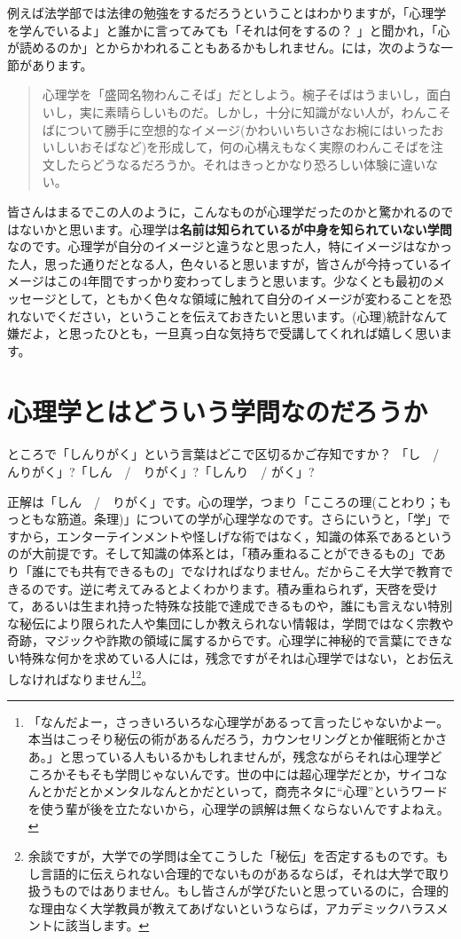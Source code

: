 \documentclass{ltjsbook}
\begin{document}
例えば法学部では法律の勉強をするだろうということはわかりますが，「心理学を学んでいるよ」と誰かに言ってみても「それは何をするの？ 」と聞かれ，「心が読めるのか」とからかわれることもあるかもしれません。\citet{道又200903}には，次のような一節があります。

\begin{quote}
    心理学を「盛岡名物わんこそば」だとしよう。椀子そばはうまいし，面白いし，実に素晴らしいものだ。しかし，十分に知識がない人が，わんこそばについて勝手に空想的なイメージ(かわいいちいさなお椀にはいったおいしいおそばなど)を形成して，何の心構えもなく実際のわんこそばを注文したらどうなるだろうか。それはきっとかなり恐ろしい体験に違いない。
\end{quote}

皆さんはまるでこの人のように，こんなものが心理学だったのかと驚かれるのではないかと思います。心理学は\textbf{名前は知られているが中身を知られていない学問}なのです。心理学が自分のイメージと違うなと思った人，特にイメージはなかった人，思った通りだとなる人，色々いると思いますが，皆さんが今持っているイメージはこの4年間ですっかり変わってしまうと思います。少なくとも最初のメッセージとして，ともかく色々な領域に触れて自分のイメージが変わることを恐れないでください，ということを伝えておきたいと思います。(心理)統計なんて嫌だよ，と思ったひとも，一旦真っ白な気持ちで受講してくれれば嬉しく思います。

\section{心理学とはどういう学問なのだろうか} 

ところで「しんりがく」という言葉はどこで区切るかご存知ですか？ 「し　/ んりがく」?「しん　/　りがく」?「しんり　/ がく」?

正解は「しん　/　りがく」です。心の理学，つまり「こころの理(ことわり；もっともな筋道。条理)」についての学が心理学なのです。さらにいうと，「学」ですから，エンターテインメントや怪しげな術ではなく，知識の体系であるというのが大前提です。そして知識の体系とは，「積み重ねることができるもの」であり「誰にでも共有できるもの」でなければなりません。だからこそ大学で教育できるのです。逆に考えてみるとよくわかります。積み重ねられず，天啓を受けて，あるいは生まれ持った特殊な技能で達成できるものや，誰にも言えない特別な秘伝により限られた人や集団にしか教えられない情報は，学問ではなく宗教や奇跡，マジックや詐欺の領域に属するからです。心理学に神秘的で言葉にできない特殊な何かを求めている人には，残念ですがそれは心理学ではない，とお伝えしなければなりません\footnote{「なんだよー，さっきいろいろな心理学があるって言ったじゃないかよー。本当はこっそり秘伝の術があるんだろう，カウンセリングとか催眠術とかさあ。」と思っている人もいるかもしれませんが，残念ながらそれは心理学どころかそもそも学問じゃないんです。世の中には超心理学だとか，サイコなんとかだとかメンタルなんとかだといって，商売ネタに``心理''というワードを使う輩が後を立たないから，心理学の誤解は無くならないんですよねえ。}\footnote{余談ですが，大学での学問は全てこうした「秘伝」を否定するものです。もし言語的に伝えられない合理的でないものがあるならば，それは大学で取り扱うものではありません。もし皆さんが学びたいと思っているのに，合理的な理由なく大学教員が教えてあげないというならば，アカデミックハラスメントに該当します。}。
\end{document}
